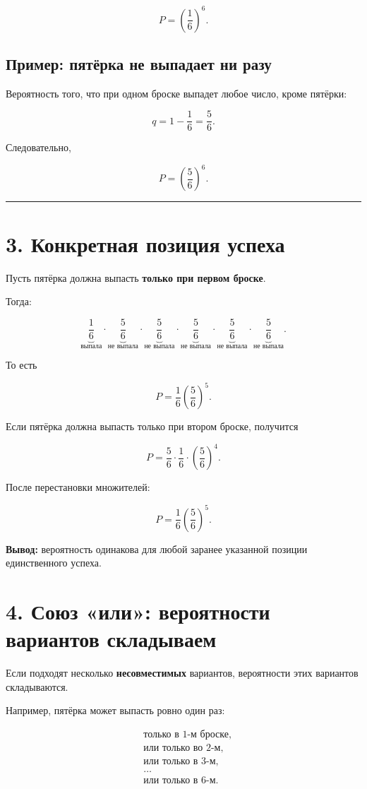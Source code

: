 \documentclass[a4paper,12pt]{article}
\newcommand{\accentline}{%
    \par\noindent
    {\color{accent}\rule{\linewidth}{0.7pt}}
    \par
}
\newcommand{\key}[1]{\textbf{\color{darkaccent}#1}}
\begin{document}
\[
P=\left(\frac16\right)^6.
\]

\subsection*{Пример: пятёрка не выпадает ни разу}

Вероятность того, что при одном броске выпадет любое число, кроме пятёрки:

\[
q=1-\frac16=\frac56.
\]

Следовательно,

\[
P=\left(\frac56\right)^6.
\]

\accentline

\section*{\color{darkaccent}3. Конкретная позиция успеха}

Пусть пятёрка должна выпасть \key{только при первом броске}.

Тогда:

\[
\underbrace{\frac16}_{\text{выпала}}
\cdot
\underbrace{\frac56}_{\text{не выпала}}
\cdot
\underbrace{\frac56}_{\text{не выпала}}
\cdot
\underbrace{\frac56}_{\text{не выпала}}
\cdot
\underbrace{\frac56}_{\text{не выпала}}
\cdot
\underbrace{\frac56}_{\text{не выпала}}.
\]

То есть

\[
P=\frac16\left(\frac56\right)^5.
\]

Если пятёрка должна выпасть только при втором броске, получится

\[
P=
\frac56\cdot\frac16\cdot
\left(\frac56\right)^4.
\]

После перестановки множителей:

\[
P=\frac16\left(\frac56\right)^5.
\]

\key{Вывод:} вероятность одинакова для любой заранее указанной позиции единственного успеха.

\section*{\color{darkaccent}4. Союз «или»: вероятности вариантов складываем}

Если подходят несколько \key{несовместимых} вариантов, вероятности этих вариантов складываются.

Например, пятёрка может выпасть ровно один раз:

\[
\begin{aligned}
&\text{только в 1-м броске},\\
&\text{или только во 2-м},\\
&\text{или только в 3-м},\\
&\ldots\\
&\text{или только в 6-м}.
\end{aligned}
\]
\end{document}
